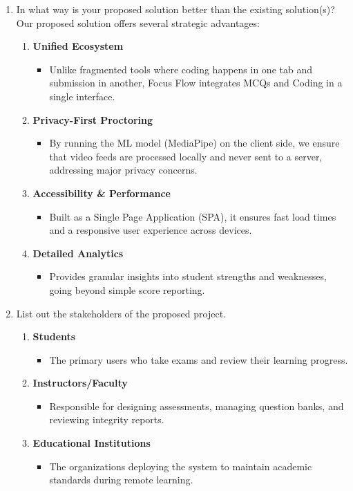 \documentclass[14pt]{article}
\begin{document}
\begin{enumerate}
\item In what way is your proposed solution better than the existing solution(s)?\\
\tabto{.5cm}Our proposed solution offers several strategic advantages:
\begin{enumerate}
\item \textbf{Unified Ecosystem}
\begin{itemize}
\item Unlike fragmented tools where coding happens in one tab and submission in another, Focus Flow integrates MCQs and Coding in a single interface.
\end{itemize}
\item \textbf{Privacy-First Proctoring}
\begin{itemize}
\item By running the ML model (MediaPipe) on the client side, we ensure that video feeds are processed locally and never sent to a server, addressing major privacy concerns.
\end{itemize}
\item \textbf{Accessibility \& Performance}
\begin{itemize}
\item Built as a Single Page Application (SPA), it ensures fast load times and a responsive user experience across devices.
\end{itemize}
\item \textbf{Detailed Analytics}
\begin{itemize}
\item Provides granular insights into student strengths and weaknesses, going beyond simple score reporting.
\end{itemize}
\end{enumerate}

\item List out the stakeholders of the proposed project.
\begin{enumerate}
\item \textbf{Students}
\begin{itemize}
\item The primary users who take exams and review their learning progress.
\end{itemize}
\item \textbf{Instructors/Faculty}
\begin{itemize}
\item Responsible for designing assessments, managing question banks, and reviewing integrity reports.
\end{itemize}
\item \textbf{Educational Institutions}
\begin{itemize}
\item The organizations deploying the system to maintain academic standards during remote learning.
\end{itemize}
\end{enumerate}


\end{enumerate}
\end{document}
